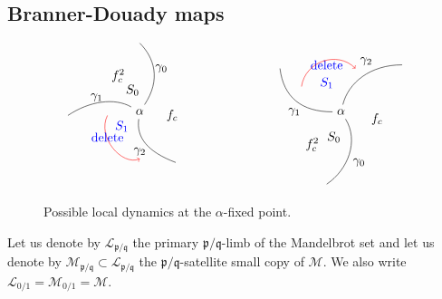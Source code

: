 \documentclass[]{amsart}
\newcommand\LL{{\mathcal L}}
\newcommand\MM{\mathcal{M}}
\newcommand{\pp}{\mathfrak{p}}
\renewcommand{\qq}{\mathfrak{q}}
\theoremstyle{remark}
\numberwithin{equation}{section}
\theoremstyle{definition}
\begin{document}
\subsection{Branner-Douady maps}
\label{ss:ap:BranDouad}


\begin{figure}[t!]
\[
\begin{tikzpicture}

\node (v1) at (-1.8,1) {$\alpha$};



\draw (v1) .. controls (-1.2,1.9) and (-1.4,2.5) .. (-1.8,2.9);


\draw (v1) .. controls (-2.5,1.4) and (-3.2,1.3) .. (-3.8,0.9);
\draw (v1) .. controls (-1.9,0.3) and (-1.6,-0.1) .. (-0.8,-0.4);

\node (v_2) at (3.8,1) {$\alpha$};
\draw (v_2) .. controls (2.7,1) and (2.2,1.4) .. (2.1,2.2);
\draw (v_2) .. controls (4.3,0.2) and (4,-0.6) .. (3.4,-1);
\draw (v_2) .. controls (4,1.8) and (4.6,2.3) .. (5.5,2.3);




\draw [red,->] (-2.7,0.9) .. controls (-3,0.3) and (-2.3,-0.5) .. (-1.8,-0.3);
\node[blue] at (-2.7,0.3) {delete};
\node[blue] at (3.4,2.3) {delete};

\draw[red,<-] (4.2,2.2) .. controls (3.7,2.7) and (2.8,2.4) .. (2.7,1.7);
\node at (4.3,-0.4) {$\gamma_0$};
\node at (-1.2,2.2) {$\gamma_0$};
\node at (2.5,1) {$\gamma_1$};
\node at (-3,1.4) {$\gamma_1$};
\node at (-1.8,-0.1) {$\gamma_2$};
\node at (4.5,2.4) {$\gamma_2$};
\node at (-2.4,2) {$f_c^2$};
\node at (3,0.1) {$f_c^2$};

\node[blue] at (-2.3,0.6) {$S_1$};
\node[blue] at (3.4,1.8) {$S_1$};
\node at (-2,1.6) {$S_0$};
\node at (3.6,0.3) {$S_0$};
\node at (-0.9,0.9) {$f_c$};
\node at (4.8,0.8) {$f_c$};
\end{tikzpicture}\]
\caption{Possible local dynamics at the $\alpha$-fixed point.}
\label{Fg:LocalPict}
 \end{figure}


Let us denote by $\LL_{ \pp/\qq}$ the primary $\pp/ \qq$-limb of the Mandelbrot set and let us denote by $\MM_{ \pp/ \qq}\subset \LL_{ \pp /\qq}$ the $\pp/\qq$-satellite small copy of $\MM.$  We also write $\LL_{0/1}=\MM_{0/1}=\MM$.
\end{document}
